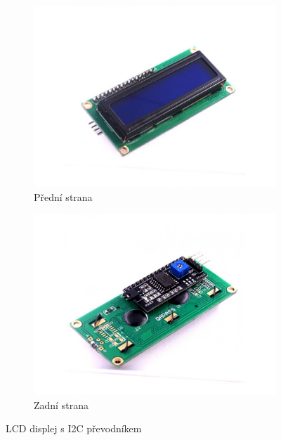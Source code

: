 \begin{figure}[H]
  \centering
  \begin{subfigure}{0.48\textwidth}
    \includegraphics[width=1\textwidth]{images/predni_LCD_s_I2C.jpg}
    \caption{Přední strana}
    \label{fig:PredniLCDDisplej}
  \end{subfigure}
  \hfill %
  \begin{subfigure}{0.48\textwidth}
    \includegraphics[width=1\textwidth]{images/zadni_LCD_s_I2C.jpg}
    \caption{Zadní strana}
    \label{fig:ZadniLCDDisplej}
  \end{subfigure}
  \caption{LCD displej s I2C převodníkem \cite{laskakit_16x2_lcd}}
  \label{fig:LcdDisplej}
\end{figure}

